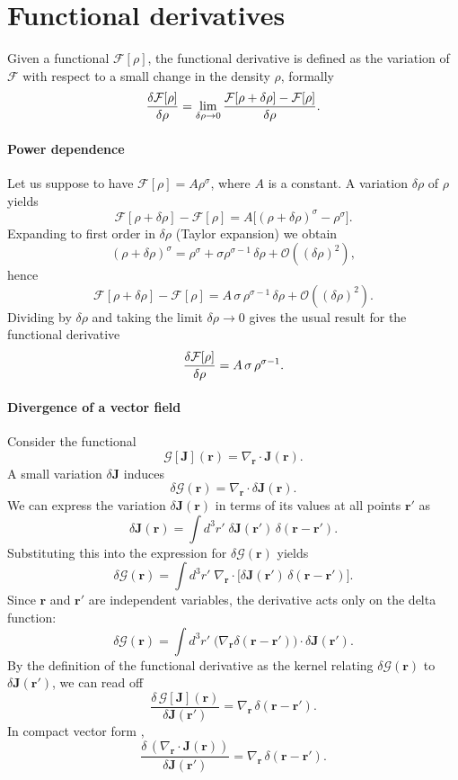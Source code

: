 \section{Functional derivatives}
\label{app:func_der}
Given a functional $\mathcal F[\rho]$, the functional derivative is defined as the variation of $\mathcal F$ with respect to a small change in the density $\rho$, formally
\begin{equation*}
    \fdv{\mathcal F[\rho]}{\rho} = \lim_{\delta \rho \to 0} \frac{\mathcal F[\rho+\delta \rho] - \mathcal F[\rho]}{\delta \rho}.
\end{equation*}
\paragraph{Power dependence}
Let us suppose to have $\mathcal F[\rho] = A\rho^{\sigma}$, where $A$ is a constant. A variation $\delta \rho$ of $\rho$ yields
\[
\mathcal F[\rho+\delta\rho] - \mathcal F[\rho]
= A\big[(\rho+\delta\rho)^{\sigma} - \rho^{\sigma}\big].
\]
Expanding to first order in $\delta\rho$ (Taylor expansion) we obtain
\[
(\rho+\delta\rho)^{\sigma} = \rho^{\sigma} + \sigma \rho^{\sigma-1}\,\delta\rho + \mathcal{O}((\delta\rho)^2),
\]
hence
\[
\mathcal F[\rho+\delta\rho] - \mathcal F[\rho] = A\,\sigma\,\rho^{\sigma-1}\,\delta\rho + \mathcal{O}((\delta\rho)^2).
\]
Dividing by $\delta\rho$ and taking the limit $\delta\rho\to 0$ gives the usual result for the functional derivative
\begin{equation}
\fdv{\mathcal F[\rho]}{\rho} = A\,\sigma\,\rho^{\sigma-1}.
\end{equation}
\paragraph{Divergence of a vector field}
Consider the functional
\[
\mathcal G[\bm J](\bm r) = \nabla_{\bm r}\!\cdot\!\bm J(\bm r).
\]
A small variation $\delta\bm J$ induces
\[
\delta\mathcal G(\bm r) = \nabla_{\bm r}\!\cdot\!\delta\bm J(\bm r).
\]
We can express the variation $\delta\bm J(\bm r)$ in terms of its values at all points $\bm r'$ as
\[
\delta\bm J(\bm r) = \int d^3r'\; \delta\bm J(\bm r')\,\delta(\bm r - \bm r').
\]
Substituting this into the expression for $\delta\mathcal G(\bm r)$ yields
\[
\delta\mathcal G(\bm r)
= \int d^3r'\; \nabla_{\bm r}\!\cdot\!\big[\delta\bm J(\bm r')\,\delta(\bm r - \bm r')\big].
\]
Since $\bm r$ and $\bm r'$ are independent variables, the derivative acts only on the delta function:
\[
\delta\mathcal G(\bm r)
= \int d^3r'\; \big(\nabla_{\bm r}\delta(\bm r - \bm r')\big)\!\cdot\!\delta\bm J(\bm r').
\]
By the definition of the functional derivative as the kernel relating $\delta\mathcal G(\bm r)$ to $\delta\bm J(\bm r')$, we can read off
\begin{equation}
\frac{\delta\,\mathcal G[\bm J](\bm r)}{\delta \bm J(\bm r')}
= \nabla_{\bm r}\,\delta(\bm r - \bm r').
\label{eq:funcder_div_vec}
\end{equation}
In compact vector form \cite{Jackson1998},
\[
\frac{\delta\,(\nabla_{\bm r}\!\cdot\!\bm J(\bm r))}{\delta \bm J(\bm r')} = \nabla_{\bm r}\,\delta(\bm r - \bm r').
\]